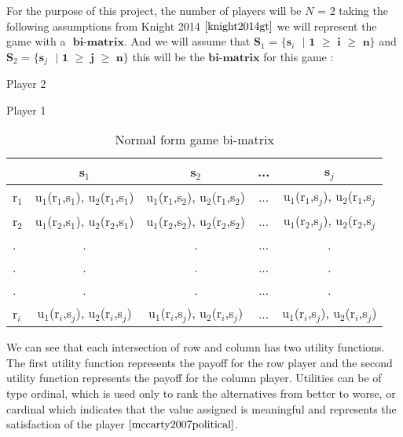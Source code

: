 For the purpose of this project, the number of players will be $\textit{N}$ = 2 taking the following assumptions from Knight 2014 $\cite{knight2014gt}$ we will represent the game with a $\textbf{ bi-matrix}$. And we will assume that  $\textbf{S$_1$ = \{s$_i$ $|$ 1  $\geq$ i $\geq$ n\}}$ and $\textbf{S$_2$ = \{s$_j$ $|$ 1  $\geq$ j $\geq$ n\}}$ this will be the $\textbf{bi-matrix}$ for this game :
\begin{table}[h]
\begin{center}
Player 2

Player 1
\begin{tabular}{|l|c|c|c|c|}
\hline
& s$_1$ & s$_2$ & ... & s$_j$\\ 
\hline
r$_1$ & u$_1$(r$_1$,s$_1$), u$_2$(r$_1$,s$_1$) & u$_1$(r$_1$,s$_2$), u$_2$(r$_1$,s$_2$) & ... &  u$_1$(r$_1$,s$_j$), u$_2$(r$_1$,s$_j$\\
\hline
r$_2$ & u$_1$(r$_2$,s$_1$), u$_2$(r$_2$,s$_1$) & u$_1$(r$_2$,s$_2$), u$_2$(r$_2$,s$_2$) & ... &  u$_1$(r$_2$,s$_j$), u$_2$(r$_2$,s$_j$\\
\hline
. & . & . & ... & .\\
. & . & . & ... & .\\
. & . & . & ... & .\\
\hline
r$_i$ & u$_1$(r$_i$,s$_j$), u$_2$(r$_i$,s$_j$) & u$_1$(r$_i$,s$_j$), u$_2$(r$_i$,s$_j$) & ... &  u$_1$(r$_i$,s$_j$), u$_2$(r$_i$,s$_j$)\\
\hline
\end{tabular}
\caption{Normal form game bi-matrix}
\label{tab:normformgame}
\end{center}
\end{table}

We can see that each intersection of row and column has two utility functions. The first utility function represents the payoff for the row player and the second utility function represents the payoff for the column player. Utilities can be of type ordinal, which is used only to rank the alternatives from better to worse, or cardinal which indicates that the value assigned is meaningful and represents the satisfaction of the player $\cite{mccarty2007political}$.


